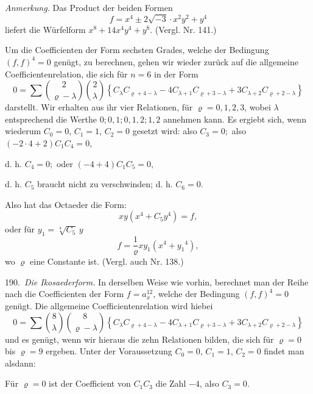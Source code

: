 \textit{Anmerkung.} Das Product der beiden Formen
\[
f=x^4\pm 2\sqrt{-3}\cdot x^2y^2+y^4
\]
liefert die Würfelform $x^8+14x^4y^4+y^8$. (Vergl. Nr. 141.)

Um die Coefficienten der Form sechsten Grades, welche der Bedingung
 $(f,f)^4=0$ genügt, zu berechnen, gehen wir wieder zurück auf
die allgemeine Coefficientenrelation, die sich für $n=6$ in der Form
\[
0=\sum\binom{2}{\varrho-\lambda}\binom{2}{\lambda}\left\{C_\lambda C_{\varrho+4-\lambda}-4C_{\lambda+1}C_{\varrho+3-\lambda}+3C_{\lambda+2}C_{\varrho+2-\lambda}\right\}
\]
darstellt. Wir erhalten aus ihr vier Relationen, für $\varrho=0,1,2,3$,
wobei $\lambda$ entsprechend die Werthe $0; 0,1; 0,1,2; 1,2$ annehmen
kann. Es ergiebt sich, wenn wiederum $C_0=0$, $C_1=1$, $C_2=0$ gesetzt
 wird:
also $C_3=0;$
also $(-2\cdot4+2)C_1C_4=0,$

d. h. $C_4=0;$
oder $(-4+4)C_1C_5=0,$

d. h. $C_5$ braucht nicht zu verschwinden;
d. h. $C_6=0.$


Also hat das Octaeder die Form:
\[
xy(x^4+C_5y^4)=f,
\]
oder für $y_1=\sqrt[4]{C_5}\,y$
\[
f=\frac{1}{\varrho}xy_1(x^4+y_1{}^4),
\]
wo $\varrho$ eine Constante ist. (Vergl. auch Nr. 138.)

190.\ \textit{Die Ikosaederform.} In derselben Weise wie vorhin, berechnet
 man der Reihe nach die Coefficienten der Form $f=a_x^{12}$, welche
der Bedingung $(f,f)^4=0$ genügt. Die allgemeine Coefficientenrelation
 wird hiebei
\[
0=\sum\binom{8}{\lambda}\binom{8}{\varrho-\lambda}\left\{C_\lambda C_{\varrho+4-\lambda}-4C_{\lambda+1}C_{\varrho+3-\lambda}+3C_{\lambda+2}C_{\varrho+2-\lambda}\right\}
\]
und es genügt, wenn wir hieraus die zehn Relationen bilden, die sich
für $\varrho=0$ bis $\varrho=9$ ergeben. Unter der Voraussetzung $C_0=0$,
$C_1=1$, $C_2=0$ findet man alsdann:

Für $\varrho=0$ ist der Coefficient von $C_1C_3$ die Zahl $-4$, also $C_3=0$.

